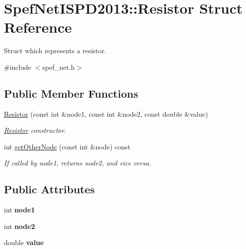 \hypertarget{structSpefNetISPD2013_1_1Resistor}{\section{Spef\-Net\-I\-S\-P\-D2013\-:\-:Resistor Struct Reference}
\label{structSpefNetISPD2013_1_1Resistor}
}


Struct which represents a resistor.  




{\ttfamily \#include $<$spef\-\_\-net.\-h$>$}

\subsection*{Public Member Functions}
\begin{DoxyCompactItemize}
\item 
\hyperlink{structSpefNetISPD2013_1_1Resistor_ac84e89149ed6b112e9c7f65d6970eedc}{Resistor} (const int \&node1, const int \&node2, const double \&value)
\begin{DoxyCompactList}\small\item\em \hyperlink{structSpefNetISPD2013_1_1Resistor}{Resistor} constructor. \end{DoxyCompactList}\item 
int \hyperlink{structSpefNetISPD2013_1_1Resistor_a3a0476c9c8c01861071eb667cc79ca22}{get\-Other\-Node} (const int \&node) const 
\begin{DoxyCompactList}\small\item\em If called by node1, returns node2, and vice versa. \end{DoxyCompactList}\end{DoxyCompactItemize}
\subsection*{Public Attributes}
\begin{DoxyCompactItemize}
\item 
\hypertarget{structSpefNetISPD2013_1_1Resistor_a3916280dff15e9c4bccafdaba9d40bac}{int {\bfseries node1}}\label{structSpefNetISPD2013_1_1Resistor_a3916280dff15e9c4bccafdaba9d40bac}

\item 
\hypertarget{structSpefNetISPD2013_1_1Resistor_a7da9cba467501e28de314d284c3cf000}{int {\bfseries node2}}\label{structSpefNetISPD2013_1_1Resistor_a7da9cba467501e28de314d284c3cf000}

\item 
\hypertarget{structSpefNetISPD2013_1_1Resistor_aa63c1d820917f71cd4ff2cbf1e83696d}{double {\bfseries value}}\label{structSpefNetISPD2013_1_1Resistor_aa63c1d820917f71cd4ff2cbf1e83696d}

\end{DoxyCompactItemize}


